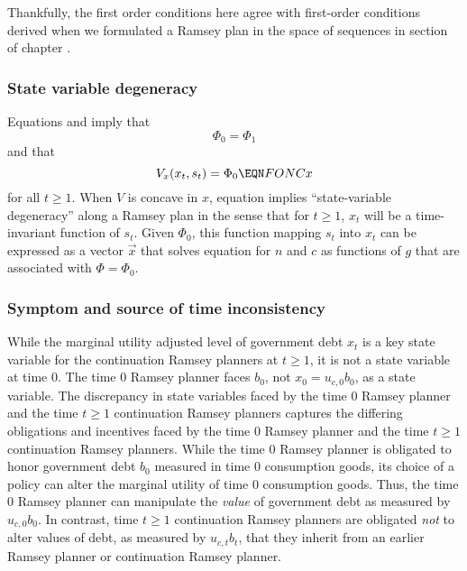 Thankfully, the first order conditions  here   agree with  first-order conditions    derived
 when we   formulated
a Ramsey plan in the space of sequences in section  of chapter .

\subsubsection{State variable degeneracy}
Equations  and    imply that
$$ \Phi_0 = \Phi_1$$
and that
$$ V_x(x_t, s_t) = \Phi_0   \EQN FONCx $$
for all $t \geq 1$.
When $V$ is concave in $x$, equation  implies  ``state-variable degeneracy'' along a Ramsey plan in the sense that
 for $t \geq 1$,
$x_t$ will be a time-invariant function of $s_t$.  Given $\Phi_0$, this function mapping $s_t$
into $x_t$  can be expressed as a vector $\vec x$ that solves
equation  for  $n$ and $c$ as functions of $g$ that are associated
with $\Phi = \Phi_0$.





\subsubsection{Symptom and source  of time inconsistency}

While the marginal utility adjusted level of government debt $x_t$ is  a key state variable for the continuation Ramsey planners at  $t \geq 1$,
it is  not a state variable at time $0$.  The time $0$ Ramsey planner faces $b_0$,  not $x_0 = u_{c,0} b_0$, as a state variable.
The discrepancy in state variables faced by the time $0$ Ramsey planner and the  time $t \geq 1$ continuation
Ramsey planners captures the differing obligations and incentives
faced by the time $0$ Ramsey planner and the time $t \geq 1$ continuation Ramsey planners.  While the time $0$ Ramsey
planner is obligated to honor government  debt $b_0$  measured in time $0$ consumption goods,
its choice of a policy  can alter the marginal utility of time $0$ consumption goods.  Thus, the time $0$ Ramsey planner can manipulate
the {\it value\/} of government debt as measured by $u_{c,0} b_0$.  In contrast, time $t \geq 1$ continuation Ramsey planners
are obligated {\it not\/} to alter  values of  debt, as measured by $u_{c,t} b_t$, that they inherit from an earlier Ramsey planner or continuation Ramsey planner.

